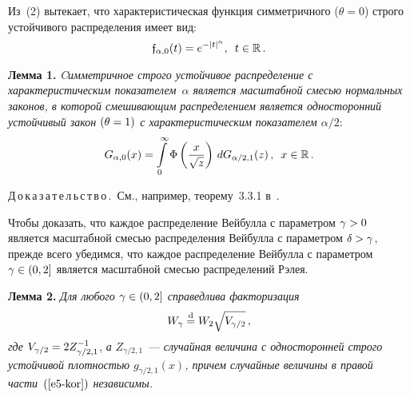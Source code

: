 \begin{multicols}{2}
Из~(2) вытекает, что характеристическая функция симметричного
($\theta=0$) строго устойчивого распределения имеет вид:
\begin{equation}
\mathfrak{f}_{\alpha,0}(t)=e^{-|t|^{\alpha}},\enskip t\in\mathbb{R}\,.
\label{e3-kor}
\end{equation}

\smallskip

\noindent

\textbf{Лемма 1.} \textit{Cимметричное строго устойчивое распределение с
характеристическим показателем~$\alpha$ является масштабной смесью
нормальных законов, в которой смешивающим распределением является
односторонний устойчивый закон $(\theta\hm=1)$ с характеристическим
показателем $\alpha/2$}:
\begin{equation}
G_{\alpha,0}(x)=\int\limits_{0}^{\infty}\Phi\left(\displaystyle\frac{\displaystyle x\mathstrut}{\displaystyle \sqrt{z}\mathstrut}\right)\,
dG_{\alpha/2,1}(z)\,,\enskip  x\in\mathbb{R}\,.\label{e4-kor}
\end{equation}

\smallskip

\noindent
Д\,о\,к\,а\,з\,а\,т\,е\,л\,ь\,с\,т\,в\,о\,.\ См., например, теорему~3.3.1
в~\cite{Zolotarev1983}.

\smallskip

Чтобы доказать, что каждое распределение Вейбулла с параметром
$\gamma\hm>0$ является масштабной смесью распределения Вейбулла с
параметром $\delta\hm>\gamma$, прежде всего убедимся, что каждое
распределение Вейбулла с параметром $\gamma\hm\in(0,2]$ является
масштабной смесью распределений Рэлея.

\smallskip

\noindent
\textbf{Лемма 2.} \textit{Для любого $\gamma\hm\in(0,2]$ справедлива
факторизация}
\begin{equation}
W_{\gamma}\stackrel{\mathrm{d}}{=} W_2 \sqrt{V_{\gamma/2}}\,,\label{e5-kor}
\end{equation}
\textit{где} $V_{\gamma/2}\hm=2Z_{\gamma/2,1}^{-1}$, {\it а}
$Z_{\gamma/2,1}$~--- \textit{случайная величина с односторонней строго
устойчивой плотностью $g_{\gamma/2,1}(x)$, причем случайные величины
в правой час\-ти~$(\ref{e5-kor})$ независимы.}

\smallskip


\end{multicols}
